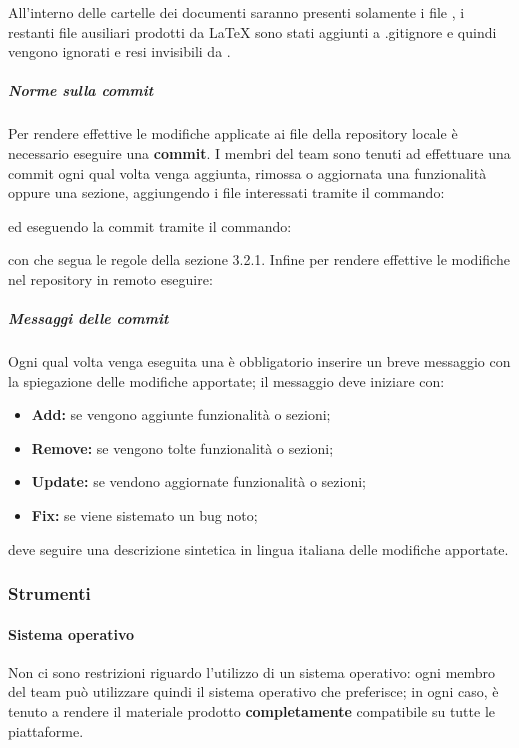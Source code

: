 		All'interno delle cartelle dei documenti saranno presenti solamente i file , i restanti file ausiliari prodotti da \LaTeX{} sono stati aggiunti a .gitignore e quindi vengono ignorati e resi invisibili da .
		\subparagraph{Norme sulla commit}
		Per rendere effettive le modifiche applicate ai file della repository locale è necessario eseguire una \textbf{commit}.
		I membri del team sono tenuti ad effettuare una commit ogni qual volta venga aggiunta, rimossa o aggiornata una funzionalità oppure una sezione, aggiungendo i file interessati tramite il commando:
		\begin{center}
		\end{center}
		ed eseguendo la commit tramite il commando:
		\begin{center}
		\end{center}
		con  che segua le regole della sezione 3.2.1.
		Infine per rendere effettive le modifiche nel repository in remoto eseguire:
		\begin{center}
		\end{center}
		\subparagraph{Messaggi delle commit}
		Ogni qual volta venga eseguita una  è obbligatorio inserire un breve messaggio con la spiegazione
		delle modifiche apportate; il messaggio deve iniziare con:
		\begin{itemize}
			\item \textbf{Add:} se vengono aggiunte funzionalità o sezioni;
			\item \textbf{Remove:} se vengono tolte funzionalità o sezioni;
			\item \textbf{Update:} se vendono aggiornate funzionalità o sezioni;
			\item \textbf{Fix:} se viene sistemato un bug noto;
		\end{itemize}
		deve seguire una descrizione sintetica in lingua italiana delle modifiche apportate.
\subsubsection{Strumenti}
	\paragraph{Sistema operativo}
	Non ci sono restrizioni riguardo l'utilizzo di un sistema operativo: ogni membro del team può utilizzare quindi il sistema operativo che preferisce; in ogni caso, è tenuto a rendere il materiale prodotto \textbf{completamente} compatibile su tutte le piattaforme.

